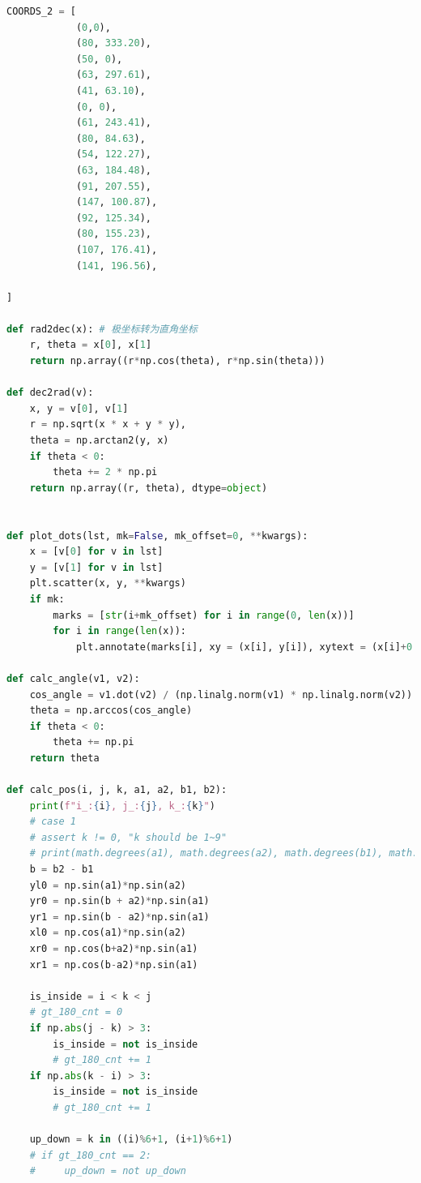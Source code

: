 \documentclass[withoutpreface,bwprint]{cumcmthesis} %
\begin{document}
\begin{appendices}
\begin{lstlisting}[language=python]
COORDS_2 = [
            (0,0), 
            (80, 333.20),
            (50, 0),
            (63, 297.61),
            (41, 63.10),
            (0, 0),
            (61, 243.41),
            (80, 84.63),
            (54, 122.27),
            (63, 184.48),
            (91, 207.55),
            (147, 100.87),
            (92, 125.34),
            (80, 155.23),
            (107, 176.41),
            (141, 196.56),

]

def rad2dec(x): # 极坐标转为直角坐标
    r, theta = x[0], x[1]
    return np.array((r*np.cos(theta), r*np.sin(theta)))

def dec2rad(v):
    x, y = v[0], v[1]
    r = np.sqrt(x * x + y * y), 
    theta = np.arctan2(y, x)
    if theta < 0:
        theta += 2 * np.pi
    return np.array((r, theta), dtype=object)


def plot_dots(lst, mk=False, mk_offset=0, **kwargs):
    x = [v[0] for v in lst]
    y = [v[1] for v in lst]
    plt.scatter(x, y, **kwargs)
    if mk:
        marks = [str(i+mk_offset) for i in range(0, len(x))]
        for i in range(len(x)):
            plt.annotate(marks[i], xy = (x[i], y[i]), xytext = (x[i]+0.5, y[i]+0.5))

def calc_angle(v1, v2):
    cos_angle = v1.dot(v2) / (np.linalg.norm(v1) * np.linalg.norm(v2))
    theta = np.arccos(cos_angle)
    if theta < 0:
        theta += np.pi
    return theta

def calc_pos(i, j, k, a1, a2, b1, b2):
    print(f"i_:{i}, j_:{j}, k_:{k}")
    # case 1
    # assert k != 0, "k should be 1~9"
    # print(math.degrees(a1), math.degrees(a2), math.degrees(b1), math.degrees(b2),sep=',')
    b = b2 - b1
    yl0 = np.sin(a1)*np.sin(a2)
    yr0 = np.sin(b + a2)*np.sin(a1)
    yr1 = np.sin(b - a2)*np.sin(a1)
    xl0 = np.cos(a1)*np.sin(a2)
    xr0 = np.cos(b+a2)*np.sin(a1)
    xr1 = np.cos(b-a2)*np.sin(a1)
    
    is_inside = i < k < j
    # gt_180_cnt = 0
    if np.abs(j - k) > 3:
        is_inside = not is_inside
        # gt_180_cnt += 1
    if np.abs(k - i) > 3:
        is_inside = not is_inside
        # gt_180_cnt += 1
    
    up_down = k in ((i)%6+1, (i+1)%6+1)
    # if gt_180_cnt == 2:
    #     up_down = not up_down
    

\end{lstlisting}
\end{appendices}
\end{document}
